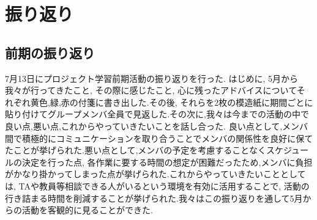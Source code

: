 \chapter{振り返り}

\section{前期の振り返り}
7月13日にプロジェクト学習前期活動の振り返りを行った. はじめに, 5月から我々が行ってきたこと, その際に感じたこと, 心に残ったアドバイスについてそれぞれ黄色,緑,赤の付箋に書き出した.その後,
それらを2枚の模造紙に期間ごとに貼り付けてグループメンバ全員で見返した.その次に,我々は今までの活動の中で良い点,悪い点,これからやっていきたいことを話し合った.
良い点として,メンバ間で積極的にコミュニケーションを取り合うことでメンバの関係性を良好に保てたことが挙げられた.悪い点として,メンバの予定を考慮することなくスケジュールの決定を行った点,
各作業に要する時間の想定が困難だったため,メンバに負担がかなり掛かってしまった点が挙げられた.これからやっていきたいこととしては, TAや教員等相談できる人がいるという環境を有効に活用することで,
活動の行き詰まる時間を削減することが挙げられた.我々はこの振り返りを通して5月からの活動を客観的に見ることができた. 

